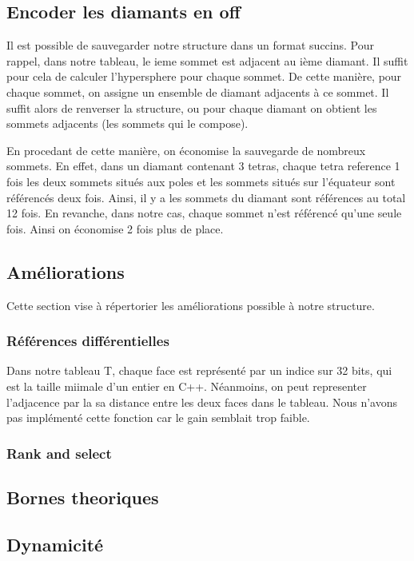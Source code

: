 \documentclass[a4paper,11pt,openany]{article}
\begin{document}
\subsection{Encoder les diamants en off}
Il est possible de sauvegarder notre structure dans un format succins. Pour rappel, dans notre tableau, le ieme sommet est adjacent au ième diamant.
Il suffit pour cela de calculer l'hypersphere pour chaque sommet. De cette manière, pour chaque sommet, on assigne un ensemble de diamant adjacents à ce sommet. Il suffit alors de renverser la structure, ou pour chaque diamant on obtient les sommets adjacents (les sommets qui le compose).

En procedant de cette manière, on économise la sauvegarde de nombreux sommets. En effet, dans un diamant contenant 3 tetras, chaque tetra reference 1 fois les deux sommets situés aux poles et les sommets situés sur l'équateur sont référencés deux fois. Ainsi, il y a les sommets du diamant sont références au total 12 fois.
En revanche, dans notre cas, chaque sommet n'est référencé qu'une seule fois. Ainsi on économise 2 fois plus de place.


\subsection{Améliorations}
Cette section vise à répertorier les améliorations possible à notre structure.
\subsubsection{Références différentielles}
Dans notre tableau T, chaque face est représenté par un indice sur 32 bits, qui est la taille miimale d'un entier en C++. Néanmoins, on peut representer l'adjacence par la sa distance entre les deux faces dans le tableau. Nous n'avons pas implémenté cette fonction car le gain semblait trop faible.
\subsubsection{Rank and select}

\subsection{Bornes theoriques}

\subsection{Dynamicité}
\end{document}
